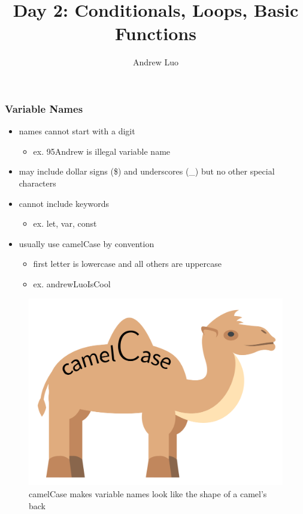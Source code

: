 \documentclass{beamer}
\title{Day 2: Conditionals, Loops, Basic Functions}
\author{Andrew Luo}
\begin{document}
\maketitle
\begin{frame}
\frametitle{Variable Names}
\begin{itemize}
	\item names cannot start with a digit
		\begin{itemize}
			\item ex. 95Andrew is illegal variable name
		\end{itemize}
	\item may include dollar signs (\$) and underscores (\_) but no other special characters
	\item cannot include keywords
		\begin{itemize}
			\item ex. let, var, const
		\end{itemize}
	\item usually use camelCase by convention
		\begin{itemize}
			\item first letter is lowercase and all others are uppercase
			\item ex. andrewLuoIsCool
		\end{itemize}
\end{itemize}
\begin{figure}[htbp]
	\centerline{\includegraphics[scale=0.08]{camelCase.png}}
	\caption{camelCase makes variable names look like the shape of a camel's back}
	\label{Fig 1}
\end{figure}
\end{frame}
\end{document}
